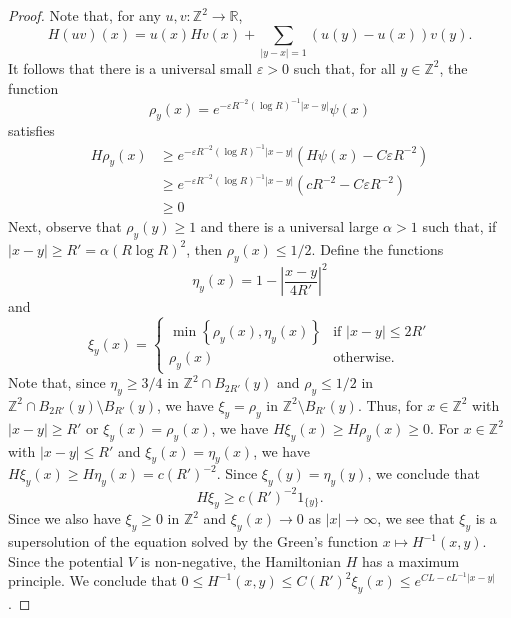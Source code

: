 \documentclass{amsart}
\numberwithin{equation}{section}
\numberwithin{figure}{section}
\newcommand{\Z}{\mathbb{Z}}
\newcommand{\R}{\mathbb{R}}
\newcommand{\ep}{\varepsilon}
\newcommand{\id}{1}
\begin{document}
\begin{proof}
Note that, for any $u, v : \Z^2 \to \R$,
\begin{equation*}
H (u v)(x) = u(x) H v(x) + \sum_{|y-x| = 1} (u(y) - u(x)) v(y).
\end{equation*}
It follows that there is a universal small $\ep > 0$ such that, for all $y \in \Z^2$, the function
\begin{equation*}
\rho_y(x) = e^{- \ep R^{-2} (\log R)^{-1} |x-y|} \psi(x)
\end{equation*}
satisfies
\begin{equation*}
\begin{aligned}
H \rho_y(x) & \geq e^{-\ep R^{-2} (\log R)^{-1} |x-y|} (H \psi (x) - C \ep R^{-2}) \\
& \geq e^{-\ep R^{-2} (\log R)^{-1} |x-y|} (c R^{-2} - C \ep R^{-2}) \\
& \geq 0
\end{aligned}
\end{equation*}
Next, observe that $\rho_y(y) \geq 1$ and there is a universal large $\alpha > 1$ such that, if $|x - y| \geq R' = \alpha (R \log R)^2$, then $\rho_y(x) \leq 1/2$.  Define the functions
\begin{equation*}
\eta_y(x) = 1 - \left|\frac{x-y}{4R'}\right|^2
\end{equation*}
and
\begin{equation*}
\xi_y(x) = \begin{cases}
\min \left\{ \rho_y(x), \eta_y(x) \right \} & \mbox{if } |x-y| \leq 2 R' \\
\rho_y(x) & \mbox{otherwise.}
\end{cases}
\end{equation*}
Note that, since $\eta_y \geq 3/4$ in $\Z^2 \cap B_{2R'}(y)$ and $\rho_y \leq 1/2$ in $\Z^2 \cap B_{2R'}(y) \setminus B_{R'}(y)$, we have $\xi_y = \rho_y$ in $\Z^2 \setminus B_{R'}(y)$.  Thus, for $x \in \Z^2$ with $|x - y| \geq R'$ or $\xi_y(x) = \rho_y(x)$, we have $H \xi_y(x) \geq H \rho_y(x) \geq 0$.  For $x \in \Z^2$ with $|x - y| \leq R'$ and $\xi_y(x) = \eta_y(x)$, we have $H \xi_y(x) \geq H \eta_y(x) = c (R')^{-2}$.  Since $\xi_y(y) = \eta_y(y)$, we conclude that \begin{equation*}
H \xi_y \geq c (R')^{-2} \id_{\{ y \}}.
\end{equation*}
Since we also have $\xi_y \geq 0$ in $\Z^2$ and $\xi_y(x) \to 0$ as $|x| \to \infty$, we see that $\xi_y$ is a supersolution of the equation solved by the Green's function $x \mapsto H^{-1}(x,y)$.  Since the potential $V$ is non-negative, the Hamiltonian $H$ has a maximum principle.  We conclude that $0 \leq H^{-1}(x,y) \leq C (R')^2 \xi_y(x) \leq e^{C L - c L^{-1}|x-y|}$.
\end{proof}
\end{document}
